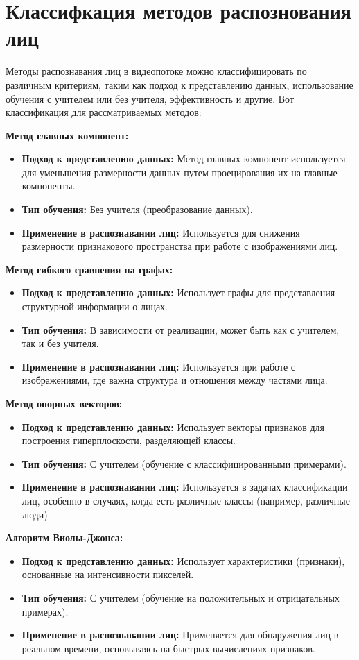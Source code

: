 \chapter{Классифкация методов распознования лиц}

Методы распознавания лиц в видеопотоке можно классифицировать по различным критериям, таким как подход к представлению данных, использование обучения с учителем или без учителя, эффективность и другие. Вот классификация для рассматриваемых методов:

\textbf{Метод главных компонент:}
\begin{itemize}
    \item \textbf{Подход к представлению данных:} Метод главных компонент используется для уменьшения размерности данных путем проецирования их на главные компоненты.
    \item \textbf{Тип обучения:} Без учителя (преобразование данных).
    \item \textbf{Применение в распознавании лиц:} Используется для снижения размерности признакового пространства при работе с изображениями лиц.
\end{itemize}

\textbf{Метод гибкого сравнения на графах:}
\begin{itemize}
    \item \textbf{Подход к представлению данных:} Использует графы для представления структурной информации о лицах.
    \item \textbf{Тип обучения:} В зависимости от реализации, может быть как с учителем, так и без учителя.
    \item \textbf{Применение в распознавании лиц:} Используется при работе с изображениями, где важна структура и отношения между частями лица.
\end{itemize}

\textbf{Метод опорных векторов:}
\begin{itemize}
    \item \textbf{Подход к представлению данных:} Использует векторы признаков для построения гиперплоскости, разделяющей классы.
    \item \textbf{Тип обучения:} С учителем (обучение с классифицированными примерами).
    \item \textbf{Применение в распознавании лиц:} Используется в задачах классификации лиц, особенно в случаях, когда есть различные классы (например, различные люди).
\end{itemize}

\textbf{Алгоритм Виолы-Джонса:}
\begin{itemize}
    \item \textbf{Подход к представлению данных:} Использует характеристики (признаки), основанные на интенсивности пикселей.
    \item \textbf{Тип обучения:} С учителем (обучение на положительных и отрицательных примерах).
    \item \textbf{Применение в распознавании лиц:} Применяется для обнаружения лиц в реальном времени, основываясь на быстрых вычислениях признаков.
\end{itemize}
